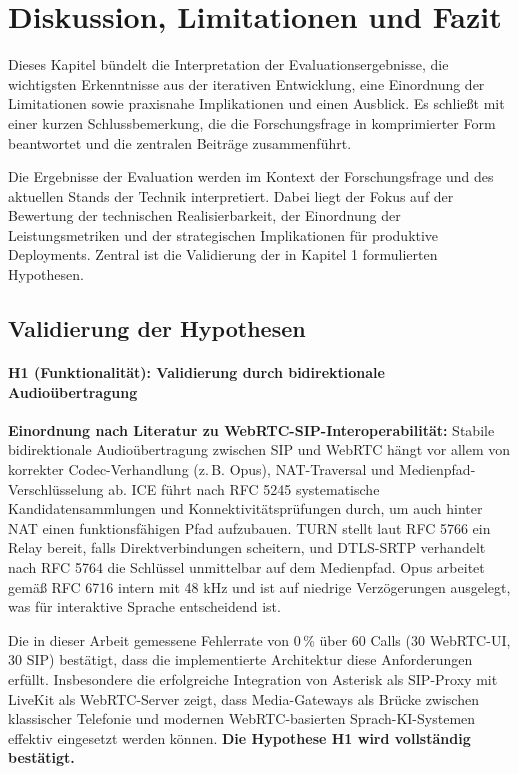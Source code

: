 \chapter{Diskussion, Limitationen und Fazit}\label{chap:diskussion}

Dieses Kapitel bündelt die Interpretation der Evaluationsergebnisse, die wichtigsten Erkenntnisse aus der iterativen Entwicklung, eine Einordnung der Limitationen sowie praxisnahe Implikationen und einen Ausblick. Es schließt mit einer kurzen Schlussbemerkung, die die Forschungsfrage in komprimierter Form beantwortet und die zentralen Beiträge zusammenführt.

Die Ergebnisse der Evaluation werden im Kontext der Forschungsfrage und des aktuellen Stands der Technik interpretiert. Dabei liegt der Fokus auf der Bewertung der technischen Realisierbarkeit, der Einordnung der Leistungsmetriken und der strategischen Implikationen für produktive Deployments. Zentral ist die Validierung der in Kapitel 1 formulierten Hypothesen.

\section{Validierung der Hypothesen}

\subsubsection{H1 (Funktionalität): Validierung durch bidirektionale Audioübertragung}

\textbf{Einordnung nach Literatur zu \acrshort{WebRTC}-\acrshort{SIP}-Interoperabilität:} Stabile bidirektionale Audioübertragung zwischen \acrshort{SIP} und \acrshort{WebRTC} hängt vor allem von korrekter Codec-Verhandlung (z.\,B. Opus), \acrshort{NAT}-Traversal und Medienpfad-Verschlüsselung ab. \acrshort{ICE} führt nach RFC 5245 \parencite{rfc5245} systematische Kandidatensammlungen und Konnektivitätsprüfungen durch, um auch hinter \acrshort{NAT} einen funktionsfähigen Pfad aufzubauen. \acrshort{TURN} stellt laut RFC 5766 \parencite{rfc5766} ein Relay bereit, falls Direktverbindungen scheitern, und \acrshort{DTLS}-\acrshort{SRTP} verhandelt nach RFC 5764 \parencite{rfc5764} die Schlüssel unmittelbar auf dem Medienpfad. Opus arbeitet gemäß RFC 6716 \parencite{rfc6716} intern mit 48 kHz und ist auf niedrige Verzögerungen ausgelegt, was für interaktive Sprache entscheidend ist.

Die in dieser Arbeit gemessene Fehlerrate von 0\,\% über 60 Calls (30 \acrshort{WebRTC}-\acrshort{UI}, 30 \acrshort{SIP}) bestätigt, dass die implementierte Architektur diese Anforderungen erfüllt. Insbesondere die erfolgreiche Integration von Asterisk als \acrshort{SIP}-Proxy mit LiveKit als \acrshort{WebRTC}-Server zeigt, dass Media-Gateways als Brücke zwischen klassischer Telefonie und modernen \acrshort{WebRTC}-basierten Sprach-\acrshort{KI}-Systemen effektiv eingesetzt werden können. \textbf{Die Hypothese H1 wird vollständig bestätigt.}

